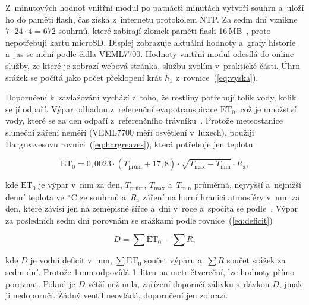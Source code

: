 Z~minutových hodnot vnitřní modul po patnácti minutách vytvoří souhrn a~uloží ho do paměti flash, čas získá z~internetu protokolem NTP. Za sedm dní vznikne $7 \cdot 24 \cdot 4 = 672$ souhrnů, které zabírají zlomek paměti flash 16\,MB~\cite{espd}, proto nepotřebuji kartu microSD. Displej zobrazuje aktuální hodnoty a~grafy historie a~jas se mění podle čidla VEML7700. Hodnoty vnitřní modul odesílá do online služby, ze které je zobrazí webová stránka, službu zvolím v~praktické části. Úhrn srážek se počítá jako počet překlopení krát $h_1$ z~rovnice~(\ref{eq:vyska}).

Doporučení k~zavlažování vychází z~toho, že rostliny potřebují tolik vody, kolik se jí odpaří. Výpar odhadnu z~referenční evapotranspirace $\mathrm{ET}_0$, což je množství vody, které se za den odpaří z~referenčního trávníku~\cite{fao56}. Protože meteostanice sluneční záření neměří (VEML7700 měří osvětlení v~luxech), použiji Hargreavesovu rovnici~(\ref{eq:hargreaves}), která potřebuje jen teplotu~\cite{fao56}

\begin{equation}
\mathrm{ET}_0 = 0{,}0023 \cdot (T_{\text{prům}} + 17{,}8) \cdot \sqrt{T_{\max} - T_{\min}} \cdot R_{\mathrm{a}},
\label{eq:hargreaves}
\end{equation}

\noindent kde $\mathrm{ET}_0$ je výpar v~mm za den, $T_{\text{prům}}$, $T_{\max}$ a~$T_{\min}$ průměrná, nejvyšší a~nejnižší denní teplota ve~$^\circ$C ze souhrnů a~$R_{\mathrm{a}}$ záření na horní hranici atmosféry v~mm za den, které závisí jen na zeměpisné šířce a~dni v~roce a~spočítá se podle~\cite{fao56}. Výpar za posledních sedm dní porovnám se srážkami podle rovnice~(\ref{eq:deficit})

\begin{equation}
D = \sum \mathrm{ET}_0 - \sum R,
\label{eq:deficit}
\end{equation}

\noindent kde $D$ je vodní deficit v~mm, $\sum \mathrm{ET}_0$ součet výparu a~$\sum R$ součet srážek za sedm dní. Protože 1\,mm odpovídá 1~litru na metr čtvereční, lze hodnoty přímo porovnat. Pokud je $D$ větší než nula, zařízení doporučí zálivku s~dávkou $D$, jinak ji nedoporučí. Žádný ventil neovládá, doporučení jen zobrazí.
